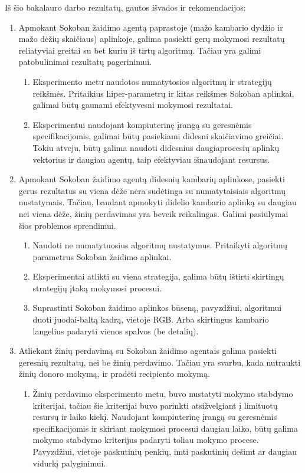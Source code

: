 \documentclass{VUMIFPSbakalaurinis}
\begin{document}
{
	Iš šio bakalauro darbo rezultatų, gautos išvados ir rekomendacijos:
	\begin{enumerate}
		\item Apmokant Sokoban žaidimo agentą paprastoje (mažo kambario dydžio ir mažo dėžių skaičiaus) aplinkoje, galima pasiekti gerų mokymosi rezultatų reliatyviai greitai su bet kuriu iš tirtų algoritmų. Tačiau yra galimi patobulinimai rezultatų pagerinimui.
		\begin{enumerate}
			\item Eksperimento metu naudotos numatytosios algoritmų ir strategijų reikšmės. Pritaikius hiper-parametrų ir kitas reikšmes Sokoban aplinkai, galimai būtų gaunami efektyvesni mokymosi rezultatai.
			\item Eksperimentui naudojant kompiuterinę įrangą su geresnėmis specifikacijomis, galimai būtų pasiekiami didesni skaičiavimo greičiai. Tokiu atveju, būtų galima naudoti didesnius daugiaprocesių aplinkų vektorius ir daugiau agentų, taip efektyviau išnaudojant resursus.
		\end{enumerate}
		\item Apmokant Sokoban žaidimo agentą didesnių kambarių aplinkose, pasiekti gerus rezultatus su viena dėže nėra sudėtinga su numatytaisiais algoritmų nustatymais. Tačiau, bandant apmokyti didelio kambario aplinką su daugiau nei viena dėže, žinių perdavimas yra beveik reikalingas. Galimi pasiūlymai šios problemos sprendimui.  
		\begin{enumerate}
			\item Naudoti ne numatytuosius algoritmų nustatymus. Pritaikyti algoritmų parametrus Sokoban žaidimo aplinkai.
			\item Eksperimentai atlikti su viena strategija, galima būtų ištirti skirtingų strategijų įtaką mokymosi procesui.
			\item Suprastinti Sokoban žaidimo aplinkos būseną, pavyzdžiui, algoritmui duoti juodai-baltą kadrą, vietoje RGB. Arba skirtingus kambario langelius padaryti vienos spalvos (be detalių).
		\end{enumerate}
		\item Atliekant žinių perdavimą su Sokoban žaidimo agentais galima pasiekti geresnių rezultatų, nei be žinių perdavimo. Tačiau yra svarbu, kada nutraukti žinių donoro mokymą, ir pradėti recipiento mokymą.
		\begin{enumerate}
			\item Žinių perdavimo eksperimento metu, buvo nustatyti mokymo stabdymo kriterijai, tačiau šie kriterijai buvo parinkti atsižvelgiant į limituotų resursų ir laiko kiekį. Naudojant kompiuterinę įrangą su geresnėmis specifikacijomis ir skiriant mokymosi procesui daugiau laiko, būtų galima mokymo stabdymo kriterijus padaryti toliau mokymo procese. Pavyzdžiui, vietoje paskutinių penkių, imti paskutinių dešimt ar daugiau vidurkį palyginimui.

\end{enumerate}
\end{enumerate}}
\end{document}
